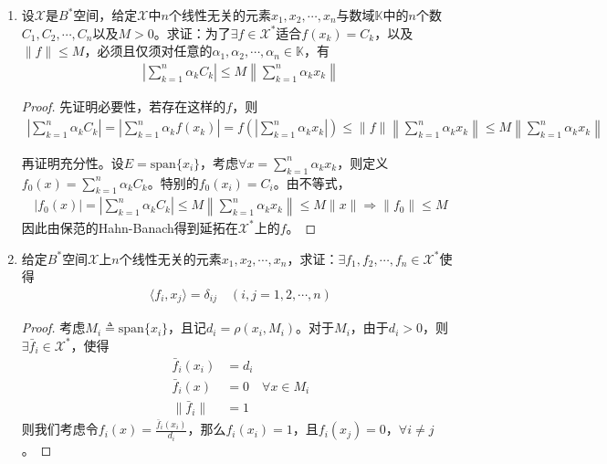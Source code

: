 \begin{enumerate}[leftmargin=2cm, label=\arabic*]
		\item 设$\mathscr{X}$是$B^*$空间，给定$\mathscr{X}$中$n$个线性无关的元素$x_1,x_2,\cdots,x_n$与数域$\mathbb{K}$中的$n$个数$C_1,C_2,\cdots,C_n$以及$M>0$。求证：为了$\exists f\in\mathscr{X}^*$适合$f(x_k)= C_k$，以及$\|f\|\leqslant M$，必须且仅须对任意的$\alpha_1,\alpha_2,\cdots,\alpha_n\in\mathbb{K}$，有
		\begin{align*}
			\left|\sum\limits_{k=1}^n \alpha_k C_k \right| \leqslant M \left\| \sum\limits_{k=1}^n \alpha_k x_k  \right\|
		\end{align*}
		\begin{proof}
			先证明必要性，若存在这样的$f$，则
			\begin{align*}
				\left|\sum\limits_{k=1}^n \alpha_k C_k \right| =  \left|\sum\limits_{k=1}^n \alpha_k f(x_k) \right| = f\left(\left|\sum\limits_{k=1}^n \alpha_k x_k \right| \right) \leqslant \|f\| \left\|\sum\limits_{k=1}^n \alpha_k x_k \right\| \leqslant M \left\| \sum\limits_{k=1}^n \alpha_k x_k  \right\|
			\end{align*}
			
			再证明充分性。设$E = \text{span}\{x_i\}$，考虑$\forall x = \sum\limits_{k=1}^n \alpha_k x_k$，则定义$f_0(x) = \sum\limits_{k=1}^n \alpha_k C_k$。特别的$f_0(x_i) = C_i$。由不等式，
			\begin{align*}
				|f_0(x)| = \left|\sum\limits_{k=1}^n \alpha_k C_k \right| \leqslant M \left\| \sum\limits_{k=1}^n \alpha_k x_k  \right\| \leqslant M\|x\| \Rightarrow \|f_0\| \leqslant M
			\end{align*}
			因此由保范的Hahn-Banach得到延拓在$\mathscr{X}^*$上的$f$。
		\end{proof}
		
		\item 给定$B^*$空间$\mathscr{X}$上$n$个线性无关的元素$x_1,x_2,\cdots,x_n$，求证：$\exists f_1,f_2,\cdots,f_n\in\mathscr{X}^*$使得
		\begin{align*}
			\langle f_i, x_j\rangle = \delta_{ij} \quad (i,j = 1,2,\cdots,n)
		\end{align*}
		\begin{proof}
			考虑$M_i\triangleq \text{span}\{x_i\}$，且记$d_i = \rho(x_i,M_i)$。对于$M_i$，由于$d_i>0$，则$\exists \bar{f}_i\in\mathscr{X}^*$，使得
			\begin{align*}
				\bar{f}_i(x_i) &= d_i \\
				\bar{f}_i(x) &= 0 \quad \forall x\in M_i \\
				\|\bar{f}_i\| &= 1
			\end{align*}
			则我们考虑令$f_i(x) = \frac{\bar{f}_i(x_i)}{d_i}$，那么$f_i(x_i) = 1$，且$f_i(x_j) = 0$，$\forall i\neq j$。
		\end{proof}
		

\end{enumerate}
